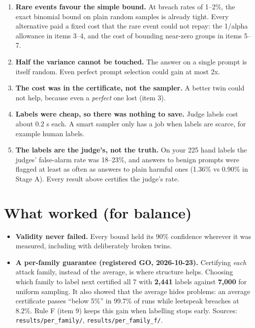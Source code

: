 \documentclass[11pt]{article}
\begin{document}
\begin{enumerate}
\item \textbf{Rare events favour the simple bound.} At breach rates of 1--2\%, the exact binomial bound on plain random samples is already tight. Every alternative paid a fixed cost that the rare event could not repay: the 1/alpha allowance in items 3--4, and the cost of bounding near-zero groups in items 5--7.
\item \textbf{Half the variance cannot be touched.} The answer on a single prompt is itself random. Even perfect prompt selection could gain at most 2x.
\item \textbf{The cost was in the certificate, not the sampler.} A better twin could not help, because even a \emph{perfect} one lost (item 3).
\item \textbf{Labels were cheap, so there was nothing to save.} Judge labels cost about 0.2 s each. A smart sampler only has a job when labels are scarce, for example human labels.
\item \textbf{The labels are the judge's, not the truth.} On your 225 hand labels the judges' false-alarm rate was 18--23\%, and answers to benign prompts were flagged at least as often as answers to plain harmful ones (1.36\% vs 0.90\% in Stage A). Every result above certifies the judge's rate.
\end{enumerate}

\section*{What worked (for balance)}

\begin{itemize}
\item \textbf{Validity never failed.} Every bound held its 90\% confidence wherever it was measured, including with deliberately broken twins.
\item \textbf{A per-family guarantee (registered GO, 2026-10-23).} Certifying \emph{each} attack family, instead of the average, is where structure helps. Choosing which family to label next certified all 7 with \textbf{2,441} labels against \textbf{7,000} for uniform sampling. It also showed that the average hides problems: an average certificate passes ``below 5\%'' in 99.7\% of runs while leetspeak breaches at 8.2\%. Rule F (item 9) keeps this gain when labelling stops early. Sources: \texttt{results/\allowbreak per\_\allowbreak family/\allowbreak }, \texttt{results/\allowbreak per\_\allowbreak family\_\allowbreak f/\allowbreak }.
\end{itemize}
\end{document}
